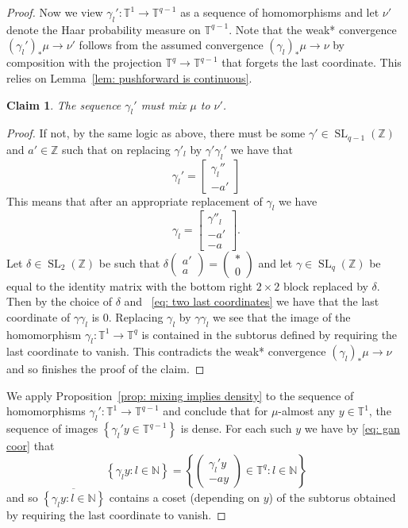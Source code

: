 \documentclass[reqno,11pt, twoside]{amsart}
\theoremstyle{plain}
\newtheorem{claim}{Claim}[thm]
\theoremstyle{definition}
\theoremstyle{definition}
\theoremstyle{remark}
\numberwithin{equation}{section}
\newcommand{\SL}{\operatorname{SL}}
\newcommand{\ga}{\gamma}
\newcommand{\del}{\delta}
\newcommand{\bZ}{\mathbb{Z}}
\newcommand{\bN}{\mathbb{N}}
\newcommand{\bT}{\mathbb{T}}
\newcommand\seta[1]{\left\{#1\right\}}
\newcommand\pa[1]{\left(#1\right)}
\newcommand\mat[1]{\pa{\begin{matrix}#1\end{matrix}}}
\newcommand\br[1]{\left[#1\right]}
\newcommand\smallmat[1]{\pa{\begin{smallmatrix}#1\end{smallmatrix}}}
\begin{document}
\begin{proof}
    Now we view $\ga_l':\bT^1\to \bT^{q-1}$ as a sequence  of homomorphisms
    and let $\nu'$ denote the Haar probability measure on $\bT^{q-1}$.
    Note that the weak* convergence $(\ga_l')_*\mu\to \nu'$ follows from the assumed convergence 
    $(\ga_l)_*\mu\to \nu$ by composition with the projection $\bT^q\to \bT^{q-1}$ that forgets the last coordinate. This relies on Lemma~\ref{lem: pushforward is continuous}. 
    \begin{claim}\label{claim: ga' mix}
    The sequence $\ga_l'$ must mix $\mu$ to $\nu'$. 
    \end{claim}
    \begin{proof}
        If not, by the same logic as above, there must be some $\ga'\in \SL_{q-1}(\bZ)$ and $a'\in \bZ$ such that on replacing $\ga'_l$ by $\ga'\ga_l'$ we have that 
    $$\ga_l' = \br{
    \begin{array}{c}
    \ga_l''\\ -a' 
    \end{array}
    }$$ This means that after an appropriate replacement of $\ga_l$ we have
    \begin{equation}\label{eq: two last coordinates}
    \ga_l =\br{
    \begin{array}{c}
    \ga''_l\\ -a'\\-a
    \end{array}
    }.
    \end{equation}
    Let $\del\in\SL_2(\bZ)$ be such that $\del\smallmat{a'\\a} = \smallmat{*\\0}$ and let $\ga\in \SL_q(\bZ)$ be equal to the identity matrix with the bottom right $2\times 2$ block replaced by $\del$. Then
    by the choice of $\del$ and ~\eqref{eq: two last coordinates} we have that the last coordinate of $\ga \ga_l$ is $0$. Replacing $\ga_l$ by $\ga\ga_l$ we see that the image of the homomorphism $\ga_l:\bT^1\to \bT^q$ is contained in the subtorus defined by requiring the last coordinate to vanish. This contradicts the weak* convergence $(\ga_l)_*\mu\to \nu$ and so finishes the proof of the claim.
    \end{proof}
    We apply Proposition~\ref{prop: mixing implies density} to the sequence of homomorphisms $\ga_l':\bT^1\to\bT^{q-1}$ and conclude that for $\mu$-almost any $y\in \bT^1$, the sequence of images $\seta{\ga_l'y \in \bT^{q-1}}$ is dense. For each such $y$ we have by \eqref{eq: gan coor} that 
   $$\seta{\ga_ly:l\in \bN} = \seta{\mat{\ga_l'y\\-ay}\in \bT^q:l\in \bN}$$
    and so $\overline{\seta{\ga_ly:l\in \bN}}$ contains a coset (depending on $y$) of the subtorus obtained by requiring the last coordinate to vanish.
\end{proof} 
\end{document}
